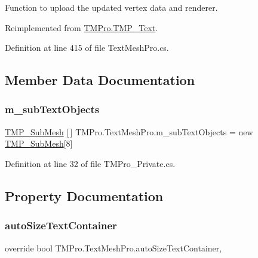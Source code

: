 Function to upload the updated vertex data and renderer. 



Reimplemented from \mbox{\hyperlink{class_t_m_pro_1_1_t_m_p___text_a63f0f98478ef7b8c9a314f74c9836e39}{T\+M\+Pro.\+T\+M\+P\+\_\+\+Text}}.



Definition at line 415 of file Text\+Mesh\+Pro.\+cs.



\subsection{Member Data Documentation}
\mbox{\label{class_t_m_pro_1_1_text_mesh_pro_a0723edfff2fc4ff3950f8258c35ead91}} 
\subsubsection{\texorpdfstring{m\_subTextObjects}{m\_subTextObjects}}
{\footnotesize\ttfamily \mbox{\hyperlink{class_t_m_pro_1_1_t_m_p___sub_mesh}{T\+M\+P\+\_\+\+Sub\+Mesh}} \mbox{[}$\,$\mbox{]} T\+M\+Pro.\+Text\+Mesh\+Pro.\+m\+\_\+sub\+Text\+Objects = new \mbox{\hyperlink{class_t_m_pro_1_1_t_m_p___sub_mesh}{T\+M\+P\+\_\+\+Sub\+Mesh}}\mbox{[}8\mbox{]}\hspace{0.3cm}{\ttfamily [protected]}}



Definition at line 32 of file T\+M\+Pro\+\_\+\+Private.\+cs.



\subsection{Property Documentation}
\mbox{\label{class_t_m_pro_1_1_text_mesh_pro_a508d9d0ba91dffc40fec00ba13e559f0}} 
\subsubsection{\texorpdfstring{autoSizeTextContainer}{autoSizeTextContainer}}
{\footnotesize\ttfamily override bool T\+M\+Pro.\+Text\+Mesh\+Pro.\+auto\+Size\+Text\+Container\hspace{0.3cm}{\ttfamily [get]}, {\ttfamily [set]}}



